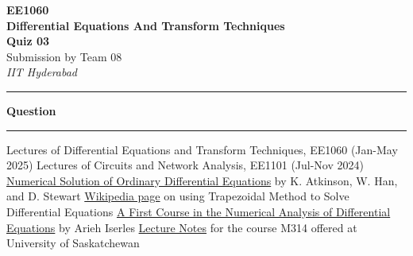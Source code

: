 \documentclass[a4paper,12pt]{article}
\renewenvironment{abstract}
 {\par\noindent\textbf{\abstractname}\ \ignorespaces \\}
 {\par\noindent\medskip}
\renewcommand{\abstractname}{Question}
\begin{document}
\pagestyle{fancy}
\thispagestyle{empty}
\fancyhead[L]{}
\renewcommand*{\thefootnote}{\fnsymbol{footnote}}
\begin{center}
\Large{\textbf{EE1060 \\ Differential Equations And Transform Techniques \\ Quiz 03}}
\vspace{0.4cm}
\normalsize
\\ Submission by Team 08 \\
\vspace{0.1cm}
\textit{IIT Hyderabad}
\medskip
\normalsize
\end{center}
{\color{gray}\hrule}
\vspace{0.4cm}
\begin{abstract}

\end{abstract}
{\color{gray}\hrule}
\medskip








\newpage
\begin{thebibliography}{9}
     Lectures of Differential Equations and Transform Techniques, EE1060 (Jan-May 2025)
     Lectures of Circuits and Network Analysis, EE1101 (Jul-Nov 2024)
     \href{https://homepage.math.uiowa.edu/~atkinson/papers/NAODE_Book.pdf}{Numerical Solution of Ordinary Differential Equations} by K. Atkinson, W. Han, and D. Stewart
     \href{https://en.wikipedia.org/wiki/Trapezoidal_rule_(differential_equations)}{Wikipedia page} on using Trapezoidal Method to Solve Differential Equations
     \href{https://books.google.co.in/books?id=7Zofw3SFTWIC&q=%22Trapezoidal+rule%22&redir_esc=y#v=snippet&q=%22Trapezoidal%20rule%22&f=false}{A First Course in the Numerical Analysis of Differential Equations} by Arieh Iserles
     \href{https://www.cs.usask.ca/~spiteri/M314/notes/AP/chap3.pdf}{Lecture Notes} for the course M314 offered at University of Saskatchewan
\end{thebibliography}
\end{document}

